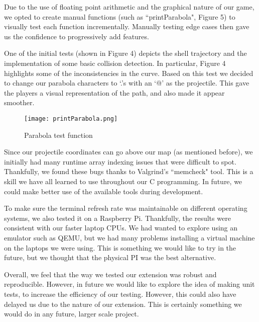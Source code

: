 \documentclass[]{article}
\begin{document}
Due to the use of floating point arithmetic and the graphical nature of our game, we opted to create manual functions (such as ``printParabola", Figure 5) to visually test each function incrementally. Manually testing edge cases then gave us the confidence to progressively add features.

\vspace{3mm}

One of the initial tests (shown in Figure 4) depicts the shell trajectory and the implementation of some basic collision detection. In particular, Figure 4 highlights some of the inconsistencies in the curve. Based on this test we decided to change our parabola characters to `.'s with an `@' as the projectile. This gave the players a visual representation of the path, and also made it appear smoother.


\vspace{3mm}


\begin{wrapfigure}[16]{L}{0.48\textwidth}
\centering
    \centering
\vspace{3mm}
  \texttt{[image: printParabola.png]}
\vspace{3mm}
  \caption{\label{fig :}Parabola test function}

\end{wrapfigure}


Since our projectile coordinates can go above our map (as mentioned before), we initially had many runtime array indexing issues that were difficult to spot. Thankfully, we found these bugs thanks to Valgrind's ``memcheck" tool. This is a skill we have all learned to use throughout our C programming. In future, we could make better use of the available tools during development.

\vspace{3mm}

To make sure the terminal refresh rate was maintainable on different operating systems, we also tested it on a Raspberry Pi. Thankfully, the results were consistent with our faster laptop CPUs. We had wanted to explore using an emulator such as QEMU, but we had many problems installing a virtual machine on the laptops we were using. This is something we would like to try in the future, but we thought that the physical PI was the best alternative.  

\vspace{3mm}

Overall, we feel that the way we tested our extension was robust and reproducible. However, in future we would like to explore the idea of making unit tests, to increase the efficiency of our testing. However, this could also have delayed us due to the nature of our extension. This is certainly something we would do in any future, larger scale project.
\end{document}
